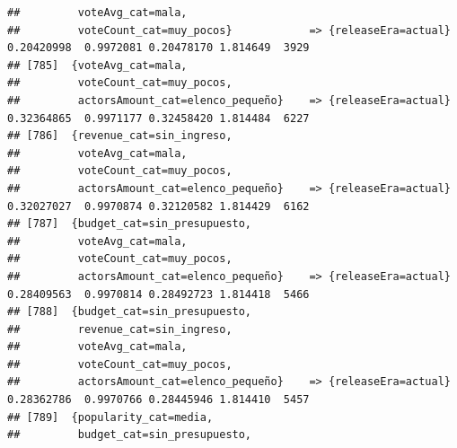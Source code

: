\documentclass[
]{article}
\begin{document}
\begin{verbatim}
##         voteAvg_cat=mala,                                                                                                       
##         voteCount_cat=muy_pocos}            => {releaseEra=actual}               0.20420998  0.9972081 0.20478170 1.814649  3929
## [785]  {voteAvg_cat=mala,                                                                                                       
##         voteCount_cat=muy_pocos,                                                                                                
##         actorsAmount_cat=elenco_pequeño}    => {releaseEra=actual}               0.32364865  0.9971177 0.32458420 1.814484  6227
## [786]  {revenue_cat=sin_ingreso,                                                                                                
##         voteAvg_cat=mala,                                                                                                       
##         voteCount_cat=muy_pocos,                                                                                                
##         actorsAmount_cat=elenco_pequeño}    => {releaseEra=actual}               0.32027027  0.9970874 0.32120582 1.814429  6162
## [787]  {budget_cat=sin_presupuesto,                                                                                             
##         voteAvg_cat=mala,                                                                                                       
##         voteCount_cat=muy_pocos,                                                                                                
##         actorsAmount_cat=elenco_pequeño}    => {releaseEra=actual}               0.28409563  0.9970814 0.28492723 1.814418  5466
## [788]  {budget_cat=sin_presupuesto,                                                                                             
##         revenue_cat=sin_ingreso,                                                                                                
##         voteAvg_cat=mala,                                                                                                       
##         voteCount_cat=muy_pocos,                                                                                                
##         actorsAmount_cat=elenco_pequeño}    => {releaseEra=actual}               0.28362786  0.9970766 0.28445946 1.814410  5457
## [789]  {popularity_cat=media,                                                                                                   
##         budget_cat=sin_presupuesto,                                                                                             

\end{verbatim}
\end{document}
